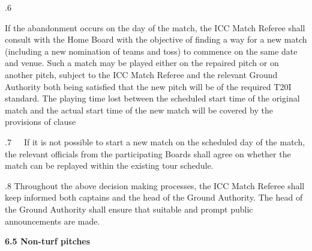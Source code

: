 \documentclass[12pt]{article}
\begin{document}
\vspace{\baselineskip}
\begin{adjustwidth}{0.5in}{0.01in}
{\fontsize{9pt}{10.8pt}.6 \tabto{0.49in} {\fontsize{8pt}{9.6pt}\selectfont If the abandonment occurs on the day of the match, the ICC Match Referee shall consult with the Home Board with the objective of finding a way for a new match (including a new nomination of teams and toss) to commence on the same date and venue. Such a match may be played either on the repaired pitch or on another pitch, subject to the ICC Match Referee and the relevant Ground Authority both being satisfied that the new pitch will be of the required T20I standard. The playing time lost between the scheduled start time of the original match and the actual start time of the new match will be covered by the provisions of clause \par}\par}\par

\end{adjustwidth}


\vspace{\baselineskip}
\begin{adjustwidth}{0.0in}{0.24in}
\begin{FlushRight}
{\fontsize{9pt}{10.8pt}.7\ \ \  If it is not possible to start a new match on the scheduled day of the match, the relevant officials from the participating Boards shall agree on whether the match can be replayed within the existing tour schedule.\par}
\end{FlushRight}\par

\end{adjustwidth}


\vspace{\baselineskip}
\begin{adjustwidth}{0.5in}{0.1in}
{\fontsize{9pt}{10.8pt}.8 \tabto{0.49in} Throughout the above decision making processes, the ICC Match Referee shall keep informed both captains and the head of the Ground Authority. The head of the Ground Authority shall ensure that suitable and prompt public announcements are made.\par}\par

\end{adjustwidth}


\vspace{\baselineskip}
{\fontsize{11pt}{13.2pt}\selectfont \textbf{6.5 \tabto{0.47in} Non-turf pitches}\par}\par
\end{document}
